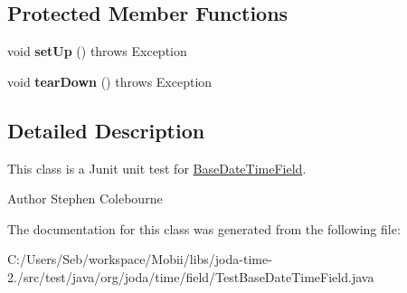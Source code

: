 \subsection*{Protected Member Functions}
\begin{DoxyCompactItemize}
\item 
\hypertarget{classorg_1_1joda_1_1time_1_1field_1_1_test_base_date_time_field_ab6407774e59271601fe13581c6dc7965}{void {\bfseries set\-Up} ()  throws Exception }\label{classorg_1_1joda_1_1time_1_1field_1_1_test_base_date_time_field_ab6407774e59271601fe13581c6dc7965}

\item 
\hypertarget{classorg_1_1joda_1_1time_1_1field_1_1_test_base_date_time_field_a0112e985e2d939a5b93cfa5dc5c92322}{void {\bfseries tear\-Down} ()  throws Exception }\label{classorg_1_1joda_1_1time_1_1field_1_1_test_base_date_time_field_a0112e985e2d939a5b93cfa5dc5c92322}

\end{DoxyCompactItemize}


\subsection{Detailed Description}
This class is a Junit unit test for \hyperlink{classorg_1_1joda_1_1time_1_1field_1_1_base_date_time_field}{Base\-Date\-Time\-Field}.

\begin{DoxyAuthor}{Author}
Stephen Colebourne 
\end{DoxyAuthor}


The documentation for this class was generated from the following file\-:\begin{DoxyCompactItemize}
\item 
C\-:/\-Users/\-Seb/workspace/\-Mobii/libs/joda-\/time-\/2./src/test/java/org/joda/time/field/Test\-Base\-Date\-Time\-Field.\-java\end{DoxyCompactItemize}
